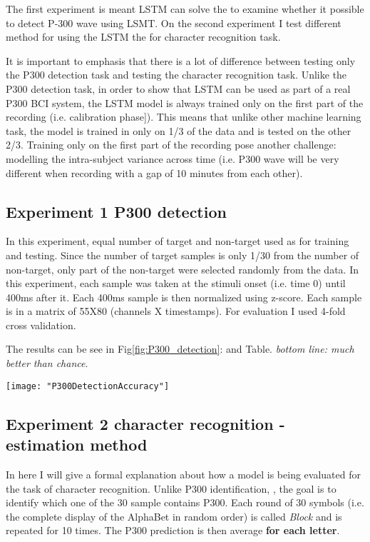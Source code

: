 \documentclass[]{report}
\begin{document}
The first experiment is meant LSTM can solve the to examine whether it possible to detect P-300 wave using LSMT. On the second experiment I test different method for using the LSTM the for character recognition task.


It is important to emphasis that there is a lot of difference between testing only the P300 detection task and testing the character recognition task. Unlike the P300 detection task, in order to show that LSTM can be used as part of a real P300 BCI system, the LSTM model is always trained only on the first part of the recording (i.e. \cite{Blankertz} calibration phase]). This means that unlike other machine learning task, the model is trained in only on 1/3 of the data and is tested on the other 2/3. Training only on the first part of the recording pose another challenge: modelling the intra-subject variance across time (i.e. P300 wave will be very different when recording with a gap of 10 minutes from each other).

\subsection{Experiment 1 P300 detection}

In this experiment, equal number of target and non-target used as for training and testing. Since the number of target samples is only 1/30 from the number of non-target, only part of the non-target were selected randomly from the data. In this experiment, each sample was taken at the stimuli onset (i.e. time 0) until 400ms after it. Each 400ms sample is then normalized using z-score. Each sample is in a matrix of 55X80 (channels X timestamps). For evaluation I used 4-fold cross validation.

The results can be see in  Fig\ref{fig:P300_detection}: and Table. \textit{bottom line: much better than chance}. 

\begin{figure*}[h]
	\texttt{[image: "P300DetectionAccuracy"]}
	\caption{P300 detection accuracy per subject}
	\label{fig:P300_detection}
\end{figure*}






\subsection{Experiment 2 character recognition - estimation method}
In here I will give a formal explanation about how a model is being evaluated for the task of character recognition. Unlike P300 identification, , the goal is to identify which one of the 30 sample contains P300. Each round of 30 symbols (i.e. the complete display of the AlphaBet in random order) is called \textit{Block} and is repeated for 10 times. The P300 prediction is then average \textbf{for each letter}.
\end{document}
